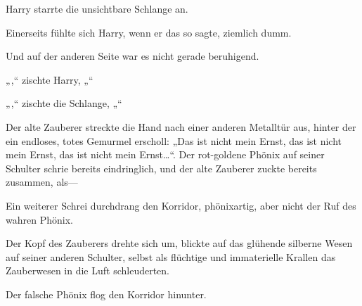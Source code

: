 Harry starrte die unsichtbare Schlange an.

Einerseits fühlte sich Harry, wenn er das so sagte, ziemlich dumm.

Und auf der anderen Seite war es nicht gerade beruhigend.

„,“ zischte Harry, „“

„,“ zischte die Schlange, „“

\later

Der alte Zauberer streckte die Hand nach einer anderen Metalltür aus, hinter der ein endloses, totes Gemurmel erscholl: „Das ist nicht mein Ernst, das ist nicht mein Ernst, das ist nicht mein Ernst…“. Der rot-goldene Phönix auf seiner Schulter schrie bereits eindringlich, und der alte Zauberer zuckte bereits zusammen, als—

Ein weiterer Schrei durchdrang den Korridor, phönixartig, aber nicht der Ruf des wahren Phönix.

Der Kopf des Zauberers drehte sich um, blickte auf das glühende silberne Wesen auf seiner anderen Schulter, selbst als flüchtige und immaterielle Krallen das Zauberwesen in die Luft schleuderten.

Der falsche Phönix flog den Korridor hinunter.

